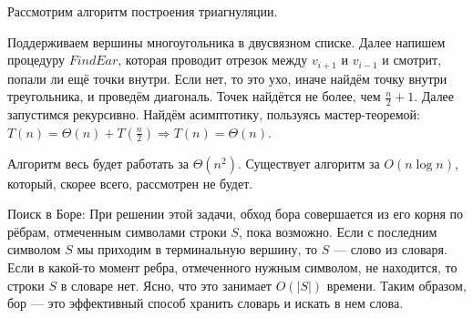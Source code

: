 Рассмотрим алгоритм построения триагнуляции.

Поддерживаем вершины многоугольника в двусвязном списке. Далее напишем процедуру $FindEar$, которая проводит отрезок между $v_{i + 1}$ и $v_{i - 1}$ и смотрит, попали ли ещё точки внутри. Если нет, то это ухо, иначе найдём точку внутри треугольника, и проведём диагональ. Точек найдётся не более, чем $\frac{n}{2} + 1$. Далее запустимся рекурсивно. Найдём асимптотику, пользуясь мастер-теоремой: $T (n) = \Theta(n) + T (\frac{n}{2}) \Longrightarrow T (n) = \Theta (n)$.

Алгоритм весь будет работать за $\Theta (n^2)$. Существует алгоритм за $O (n \log n)$, который, скорее всего, рассмотрен не будет.

Поиск в Боре:
При решении этой задачи, обход бора совершается из его корня по рёбрам, отмеченным символами строки $S$, пока возможно. Если с последним символом $S$ мы приходим в терминальную вершину, то $S$ — слово из словаря. Если в какой-то момент ребра, отмеченного нужным символом, не находится, то строки $S$ в словаре нет. Ясно, что это занимает $O(|S|)$ времени. Таким образом, бор — это эффективный способ хранить словарь и искать в нем слова.